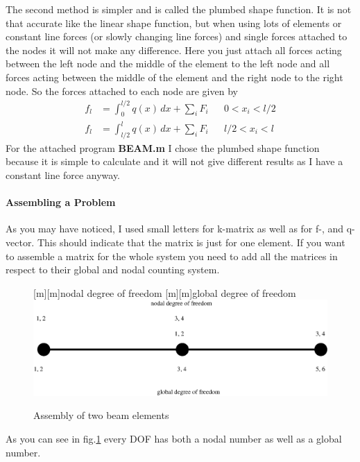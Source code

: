The second method is simpler and is called the plumbed shape function. It is not that accurate like the linear shape function, but when using lots of elements or constant line forces (or slowly changing line forces) and single forces attached to the nodes it will not make any difference. Here you just attach all forces acting between the left node and the middle of the element to the left node and all forces acting between the middle of the element and the right node to the right node. So the forces attached to each node are given by
\begin{align}
f_l&=\int_0^{l/2}q(x)\,dx+\sum_iF_i &&0<x_i<l/2 \nonumber \\
f_l&=\int_{l/2}^{l}q(x)\,dx+\sum_iF_i &&l/2<x_i<l \nonumber
\end{align}
For the attached program \textbf{BEAM.m} I chose the plumbed shape function because it is simple to calculate and it will not give different results as I have a constant line force anyway.
\bigskip

\paragraph{Assembling a Problem} As you may have noticed, I used small letters for k-matrix as well as for f-, and q-vector. This should indicate that the matrix is just for one element. If you want to assemble a matrix for the whole system you need to add all the matrices in respect to their global and nodal counting system.
\bigskip 

\begin{figure}[!h]
\begin{center}
[m][m]{nodal degree of freedom}
[m][m]{global degree of freedom}
\includegraphics[scale=0.6]{assembly} 
\caption{Assembly of two beam elements}
\label{assembly}
\end{center}
\end{figure}

As you can see in fig.\ref{assembly} every DOF has both a nodal number as well as a global number. 
